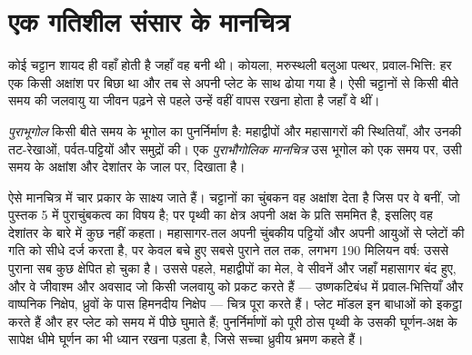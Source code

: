 \section{एक गतिशील संसार के मानचित्र}\label{sec:b2:phanerozoic-earth:maps}

कोई चट्टान शायद ही वहाँ होती है जहाँ वह बनी थी। कोयला, मरुस्थली बलुआ पत्थर, प्रवाल-भित्ति: हर एक किसी
अक्षांश पर बिछा था और तब से अपनी प्लेट के साथ ढोया गया है। ऐसी चट्टानों से किसी बीते समय की
जलवायु या जीवन पढ़ने से पहले उन्हें वहीं वापस रखना होता है जहाँ वे थीं।

\begin{definition}[पुराभूगोल; पुराभौगोलिक मानचित्र]\label{def:b2:phanerozoic-earth:palaeogeography}
\emph{पुराभूगोल} किसी बीते समय के भूगोल का पुनर्निर्माण है:
महाद्वीपों और महासागरों की स्थितियाँ, और उनकी तट-रेखाओं, पर्वत-पट्टियों और
समुद्रों की। एक \emph{पुराभौगोलिक मानचित्र} उस भूगोल को एक
समय पर, उसी समय के अक्षांश और देशांतर के जाल पर, दिखाता है।
\end{definition}

ऐसे मानचित्र में चार प्रकार के साक्ष्य जाते हैं। चट्टानों का चुंबकन वह अक्षांश देता है जिस पर
वे बनीं, जो पुस्तक 5 में पुराचुंबकत्व का विषय है; पर पृथ्वी का क्षेत्र अपनी अक्ष के प्रति
सममित है, इसलिए वह देशांतर के बारे में कुछ नहीं कहता। महासागर-तल अपनी चुंबकीय पट्टियों और अपनी आयुओं से
प्लेटों की गति को सीधे दर्ज करता है, पर केवल
बचे हुए सबसे पुराने तल तक, लगभग 190 मिलियन वर्ष: उससे पुराना सब कुछ क्षेपित हो चुका है। उससे पहले,
महाद्वीपों का मेल, वे सीवनें और  जहाँ महासागर बंद हुए, और वे जीवाश्म और
अवसाद जो किसी जलवायु को प्रकट करते हैं --- उष्णकटिबंध में प्रवाल-भित्तियाँ और वाष्पनिक निक्षेप, ध्रुवों के पास हिमनदीय
निक्षेप --- चित्र पूरा करते हैं। प्लेट मॉडल इन बाधाओं को इकट्ठा करते हैं और हर प्लेट को समय में
पीछे घुमाते हैं; पुनर्निर्माणों को पूरी ठोस पृथ्वी के उसकी घूर्णन-अक्ष के सापेक्ष धीमे घूर्णन का भी
ध्यान रखना पड़ता है, जिसे सच्चा ध्रुवीय भ्रमण कहते हैं।

